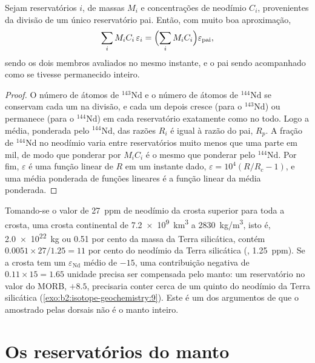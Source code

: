 \begin{proposition}\label{prop:b2:isotope-geochemistry:mass-balance}
Sejam reservatórios $i$, de massas $M_i$ e concentrações de neodímio $C_i$, provenientes
da divisão de um único reservatório pai. Então, com muito boa aproximação,
\[
  \sum_i M_i C_i\, \varepsilon_i = \Bigl(\sum_i M_i C_i\Bigr) \varepsilon_{\text{pai}},
\]
sendo os dois membros avaliados no mesmo instante, e o pai sendo acompanhado como se
tivesse permanecido inteiro.
\end{proposition}

\begin{proof}
O número de átomos de $^{143}\mathrm{Nd}$ e o número de átomos de $^{144}\mathrm{Nd}$
se conservam cada um na divisão, e cada um depois cresce (para o
$^{143}\mathrm{Nd}$) ou permanece (para o $^{144}\mathrm{Nd}$) em cada reservatório exatamente como
no todo. Logo a média, ponderada pelo $^{144}\mathrm{Nd}$, das razões $R_i$ é igual à
razão do pai, $R_p$. A fração de $^{144}\mathrm{Nd}$ no neodímio varia
entre reservatórios muito menos que uma parte em mil, de modo que ponderar por
$M_iC_i$ é o mesmo que ponderar pelo $^{144}\mathrm{Nd}$. Por fim, $\varepsilon$ é uma
função linear de $R$ em um instante dado, $\varepsilon = 10^4(R/R_c - 1)$, e uma
média ponderada de funções lineares é a função linear da média ponderada.
\end{proof}

Tomando-se o valor de \qty{27}{ppm} de neodímio da crosta superior para toda a
crosta, uma crosta continental de \qty{7.2e9}{km^3} a \qty{2830}{kg/m^3}, isto é,
\qty{2.0e22}{kg} ou 0.51 por cento da massa da Terra silicática, contém
$0.0051\times27/1.25 = 11$ por cento do neodímio da Terra silicática (, \qty{1.25}{ppm}). Se a crosta tem um $\varepsilon_{\mathrm{Nd}}$ médio de
$-15$, uma contribuição negativa de $0.11\times15 = 1.65$ unidade precisa ser
compensada pelo manto: um reservatório no valor do MORB, $+8.5$, precisaria conter
cerca de um quinto do neodímio da Terra silicática (\cref{exo:b2:isotope-geochemistry:9}). Este é um dos
argumentos de que o  amostrado pelas dorsais não é o manto
inteiro.

\section{Os reservatórios do manto}

